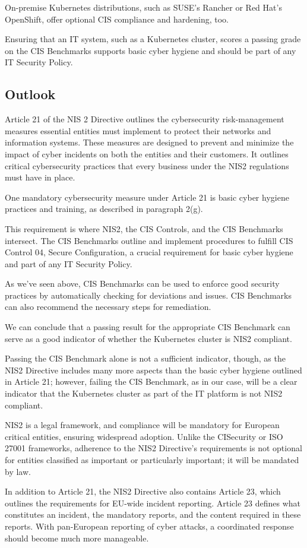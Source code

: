 On-premise Kubernetes distributions, such as SUSE's Rancher or Red Hat's OpenShift, offer optional CIS compliance and hardening, too. 

Ensuring that an IT system, such as a Kubernetes cluster, scores a passing grade on the CIS Benchmarks supports basic cyber hygiene and should be part of any IT Security Policy.

\subsection{Outlook}

Article 21 of the NIS 2 Directive outlines the cybersecurity risk-management measures essential entities must implement to protect their networks and information systems. These measures are designed to prevent and minimize the impact of cyber incidents on both the entities and their customers. It outlines critical cybersecurity practices that every business under the NIS2 regulations must have in place. 

One mandatory cybersecurity measure under Article 21 is basic cyber hygiene practices and training, as described in paragraph 2(g).

This requirement is where NIS2, the CIS Controls, and the CIS Benchmarks intersect. The CIS Benchmarks outline and implement procedures to fulfill CIS Control 04, Secure Configuration, a crucial requirement for basic cyber hygiene and part of any IT Security Policy.

As we've seen above, CIS Benchmarks can be used to enforce good security practices by automatically checking for deviations and issues. CIS Benchmarks can also recommend the necessary steps for remediation.

We can conclude that a passing result for the appropriate CIS Benchmark can serve as a good indicator of whether the Kubernetes cluster is NIS2 compliant.

Passing the CIS Benchmark alone is not a sufficient indicator, though, as the NIS2 Directive includes many more aspects than the basic cyber hygiene outlined in Article 21; however, failing the CIS Benchmark, as in our case, will be a clear indicator that the Kubernetes cluster as part of the IT platform is not NIS2 compliant.

NIS2 is a legal framework, and compliance will be mandatory for European critical entities, ensuring widespread adoption. Unlike the CISecurity or ISO 27001 frameworks, adherence to the NIS2 Directive's requirements is not optional for entities classified as important or particularly important; it will be mandated by law.

In addition to Article 21, the NIS2 Directive also contains Article 23, which outlines the requirements for EU-wide incident reporting. Article 23 defines what constitutes an incident, the mandatory reports, and the content required in these reports. With pan-European reporting of cyber attacks, a coordinated response should become much more manageable.
